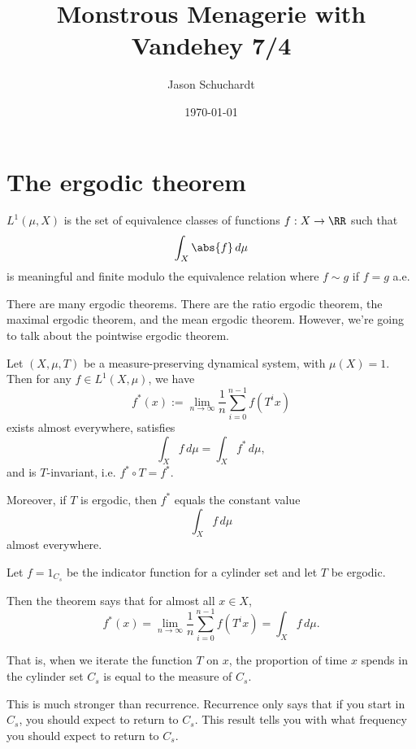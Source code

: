 \documentclass{article}
\title{Monstrous Menagerie with Vandehey 7/4}
\author{Jason Schuchardt}
\date{\today}
\theoremstyle{remark}
\begin{document}
\maketitle

\section{The ergodic theorem}

\begin{definition}
$L^1(\mu,X)$ is the set of equivalence classes of 
functions $f:X\to \RR$ such that 
\[ \int_X \abs{f} \, d\mu \]
is meaningful and finite modulo the equivalence relation
where $f\sim g$ if $f=g$ a.e. 
\end{definition}

There are many ergodic theorems. There are 
the ratio ergodic theorem, the maximal 
ergodic theorem, and the mean ergodic 
theorem. However, we're going to talk about
the pointwise ergodic theorem.

\begin{theorem}
Let $(X,\mu,T)$ be a measure-preserving dynamical system,
with $\mu(X)=1$. Then for any $f\in L^1(X,\mu)$, we have
\[f^*(x) := \lim_{n\to\infty} 
\frac{1}{n} \sum_{i=0}^{n-1} f(T^ix)
\]
exists almost everywhere, satisfies
\[
\int_X f\,d\mu  = \int_X f^*\,d\mu,
\]
and is $T$-invariant, i.e. $f^*\circ T = f^*$.

Moreover, if $T$ is ergodic, then $f^*$ equals the constant value
\[\int_X f\,d\mu \]
almost everywhere.
\end{theorem}

\begin{example}
    Let $f=1_{C_s}$ be the indicator function for a cylinder set and 
    let $T$ be ergodic.

    Then the theorem says that for almost all $x\in X$,
    \[f^*(x) = \lim_{n\to\infty} \frac{1}{n} 
    \sum_{i=0}^{n-1} f(T^ix)
    =\int_X f\,d\mu. \]

    That is, when we iterate the function $T$ on $x$, the 
    proportion of time $x$ spends in the cylinder set $C_s$
    is equal to the measure of $C_s$. 

    This is much stronger than recurrence. Recurrence only says
    that if you start in $C_s$, you should expect to return
    to $C_s$. This result tells you with what frequency you should 
    expect to return to $C_s$.
\end{example}
\end{document}
